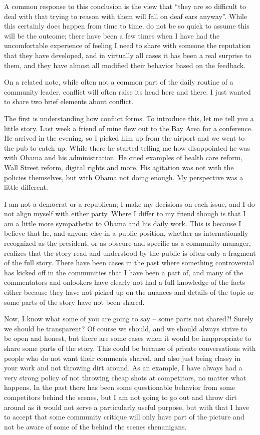 A common response to this conclusion is the view that ``they are so difficult to
deal with that trying to reason with them will fall on deaf ears anyway''. While
this certainly does happen from time to time, do not be so quick to assume this
will be the outcome; there have been a few times when I have had the
uncomfortable experience of feeling I need to share with someone the reputation
that they have developed, and in virtually all cases it has been a real surprise
to them, and they have almost all modified their behavior based on the feedback.

On a related note, while often not a common part of the daily routine of a
community leader, conflict will often raise its head here and there. I just
wanted to share two brief elements about conflict.

The first is understanding how conflict forms. To introduce this, let me tell
you a little story. Last week a friend of mine flew out to the Bay Area for a
conference. He arrived in the evening, so I picked him up from the airport and
we went to the pub to catch up. While there he started telling me how
disappointed he was with Obama and his administration. He cited examples of
health care reform, Wall Street reform, digital rights and more. His agitation
was not with the policies themselves, but with Obama not doing enough. My
perspective was a little different.

I am not a democrat or a republican; I make my decisions on each issue, and I do
not align myself with either party. Where I differ to my friend though is that I
am a little more sympathetic to Obama and his daily work. This is because I
believe that he, and anyone else in a public position, whether as
internationally recognized as the president, or as obscure and specific as a
community manager, realizes that the story read and understood by the public is
often only a fragment of the full story. There have been cases in the past where
something controversial has kicked off in the communities that I have been a
part of, and many of the commentators and onlookers have clearly not had a full
knowledge of the facts either because they have not picked up on the nuances and
details of the topic or some parts of the story have not been shared.

Now, I know what some of you are going to say -- some parts not shared?! Surely
we should be transparent? Of course we should, and we should always strive to be
open and honest, but there are some cases when it would be inappropriate to
share some parts of the story. This could be because of private conversations
with people who do not want their comments shared, and also just being classy in
your work and not throwing dirt around. As an example, I have always had a very
strong policy of not throwing cheap shots at competitors, no matter what
happens. In the past there has been some questionable behavior from some
competitors behind the scenes, but I am not going to go out and throw dirt
around as it would not serve a particularly useful purpose, but with that I have
to accept that some community critique will only have part of the picture and
not be aware of some of the behind the scenes shenanigans.

